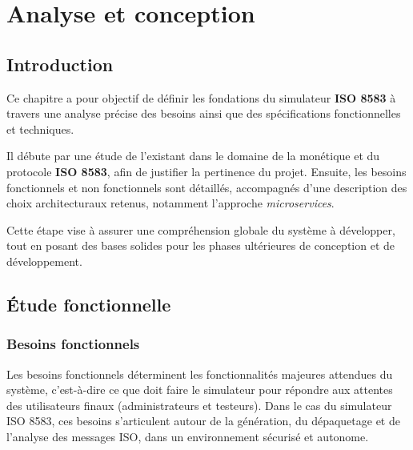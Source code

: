 
\chapter{Analyse et conception}

\section*{Introduction}

Ce chapitre a pour objectif de définir les fondations du simulateur \textbf{ISO 8583} à travers une analyse précise des besoins ainsi que des spécifications fonctionnelles et techniques.

Il débute par une étude de l’existant dans le domaine de la monétique et du protocole \textbf{ISO 8583}, afin de justifier la pertinence du projet. Ensuite, les besoins fonctionnels et non fonctionnels sont détaillés, accompagnés d’une description des choix architecturaux retenus, notamment l’approche \textit{microservices}.

Cette étape vise à assurer une compréhension globale du système à développer, tout en posant des bases solides pour les phases ultérieures de conception et de développement.


\section{Étude fonctionnelle}
\subsection{Besoins fonctionnels}

Les besoins fonctionnels déterminent les fonctionnalités majeures attendues du système, c'est-à-dire ce que doit faire le simulateur pour répondre aux attentes des utilisateurs finaux (administrateurs et testeurs). Dans le cas du simulateur ISO 8583, ces besoins s'articulent autour de la génération, du dépaquetage et de l'analyse des messages ISO, dans un environnement sécurisé et autonome.

